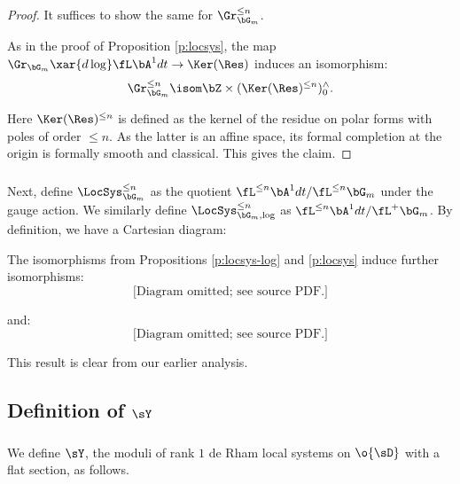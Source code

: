 \begin{proof}

It suffices to show the same for $\Gr_{\bG_m}^{\leq n}$.

As in the proof of Proposition \ref{p:locsys}, the map
$\Gr_{\bG_m} \xar{d\log} \fL \bA^1 dt \to \Ker(\Res)$ induces an
isomorphism:
%
\[
\Gr_{\bG_m}^{\leq n} \isom \bZ \times (\Ker(\Res)^{\leq n})_0^{\wedge}.
\]

 Here $\Ker(\Res)^{\leq n}$
is defined as the kernel of the
residue on polar forms with poles of order $\leq n$.
As the latter is an affine space, its formal completion at the origin
is formally smooth and classical. This gives the claim.

\end{proof}

\subsubsection{}

Next, define $\LocSys_{\bG_m}^{\leq n}$ as the quotient
$\fL^{\leq n} \bA^1 dt/\fL^{\leq n} \bG_m$ under the gauge action.
We similarly define $\LocSys_{\bG_m,\log}^{\leq n}$ as
$\fL^{\leq n} \bA^1 dt/\fL^+ \bG_m$. By definition,
we have a Cartesian diagram:

\begin{prop}
\notready\label{p:locsys-trun}

The isomorphisms from Propositions \ref{p:locsys-log} and \ref{p:locsys}
induce further isomorphisms:
%
\[
\text{[Diagram omitted; see source PDF.]}
\]

 and:
%
\[
\text{[Diagram omitted; see source PDF.]}
\]

\end{prop}

This result is clear from our earlier analysis.


\subsection{Definition of $\sY$}\label{ss:y-defin}

\subsubsection{}

We define $\sY$, the moduli of rank $1$ de Rham local systems on $\o{\sD}$
with a flat section, as follows.

